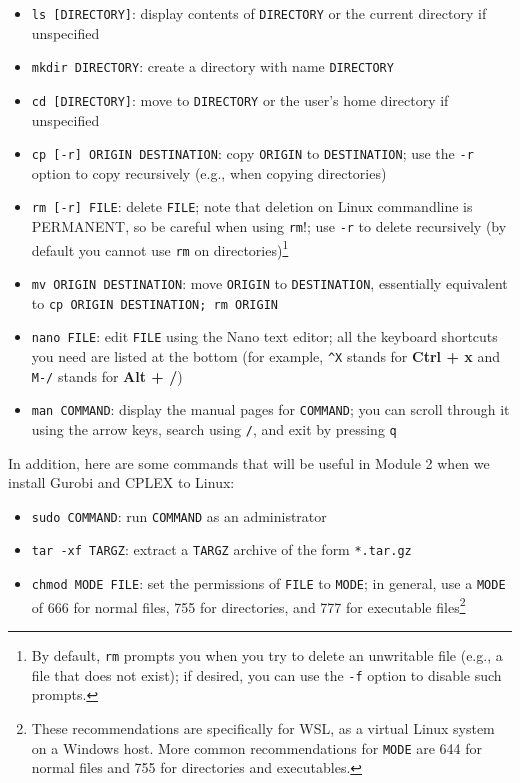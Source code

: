 \documentclass[12pt]{article}
\begin{document}
\begin{itemize}
    \item \texttt{ls [DIRECTORY]}: display contents of \texttt{DIRECTORY} or the current directory if unspecified
    \item \texttt{mkdir DIRECTORY}: create a directory with name \texttt{DIRECTORY}
    \item \texttt{cd [DIRECTORY]}: move to \texttt{DIRECTORY} or the user's home directory if unspecified %
    \item \texttt{cp [-r] ORIGIN DESTINATION}: copy \texttt{ORIGIN} to \texttt{DESTINATION}; use the \texttt{-r} option to copy recursively (e.g., when copying directories)
    \item \texttt{rm [-r] FILE}: delete \texttt{FILE}; note that deletion on Linux commandline is PERMANENT, so be careful when using \texttt{rm}!; use \texttt{-r} to delete recursively (by default you cannot use \texttt{rm} on directories)\footnote{
        By default, \texttt{rm} prompts you when you try to delete an unwritable file (e.g., a file that does not exist); if desired, you can use the \texttt{-f} option to disable such prompts.
        }
    \item \texttt{mv ORIGIN DESTINATION}: move \texttt{ORIGIN} to \texttt{DESTINATION}, essentially equivalent to \texttt{cp ORIGIN DESTINATION; rm ORIGIN}
    \item \texttt{nano FILE}: edit \texttt{FILE} using the Nano text editor; all the keyboard shortcuts you need are listed at the bottom (for example, \texttt{\^{}X} stands for \textbf{Ctrl + x} and \texttt{M-/} stands for \textbf{Alt + /})
    \item \texttt{man COMMAND}: display the manual pages for \texttt{COMMAND}; you can scroll through it using the arrow keys, search using \texttt{/}, and exit by pressing \texttt{q}
\end{itemize}

In addition, here are some commands that will be useful in Module 2 when we install Gurobi and CPLEX to Linux:

\begin{itemize}
    \item \texttt{sudo COMMAND}: run \texttt{COMMAND} as an administrator
    \item \texttt{tar -xf TARGZ}: extract a \texttt{TARGZ} archive of the form \texttt{*.tar.gz}
    \item \texttt{chmod MODE FILE}: set the permissions of \texttt{FILE} to \texttt{MODE}; in general, use a \texttt{MODE} of 666 for normal files, 755 for directories, and 777 for executable files\footnote{
        These recommendations are specifically for WSL, as a virtual Linux system on a Windows host.
        More common recommendations for \texttt{MODE} are 644 for normal files and 755 for directories and executables.
        }
\end{itemize}
\end{document}

